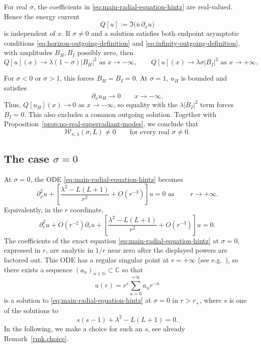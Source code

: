 \documentclass[11pt]{article}
\numberwithin{equation}{section}
\begin{document}
	{For real $\sigma$, the coefficients in \eqref{eq:main-radial-equation-hintz} are real-valued.} Hence the energy current
	\begin{equation}
		Q[u]:=\Im\bigl(\overline u\,\partial_xu\bigr)
		\label{eq:usual-flux}
	\end{equation}
	is independent of $x$. If $\sigma\neq0$ and a solution
	satisfies both endpoint asymptotic conditions \eqref{eq:horizon-outgoing-definition} and \eqref{eq:infinity-outgoing-definition}, with amplitudes $B_H,B_I$
	possibly zero, then
	\begin{equation}
		Q[u](x)\to\lambda(1-\sigma)|B_H|^2
		\text{ as } x\to -\infty,
		\qquad
		Q[u](x)\mathrel{{\to}}\lambda\sigma|B_I|^2
		\text{ as } x\to +\infty.
		\label{eq:real-frequency-fluxes}
	\end{equation}
	
	
	For $\sigma<0$ or $\sigma>1$, this
	forces $B_H=B_I=0$. At $\sigma=1$, $u_H$ is
	bounded and satisfies
	\[
	\partial_xu_H\longrightarrow0\qquad x\to-\infty.
	\]
	Thus, $Q[u_H](x)\to 0$ as $x\to -\infty$, so equality with the
	$\lambda|B_I|^2$ term forces $B_I=0$. This also excludes
	a common outgoing solution. Together with
	Proposition~\ref{prop:no-real-superradiant-modes}, we conclude that
	\begin{equation}
		\mathcal W_{\kappa,\lambda}(\sigma,L)\neq0
		\qquad\text{for every real }\sigma\neq0.
		\label{eq:no-real-zeroes-except-threshold}
	\end{equation}
	
	\subsection{The case \texorpdfstring{$\sigma=0$}{sigma = 0}}
	
	At $\sigma=0$, the ODE \eqref{eq:main-radial-equation-hintz} becomes
	\begin{equation}
		\partial_x^2u+
		\left[\frac{\lambda^2-L(L+1)}{r^2}+O(r^{-3})\right]u=0 \text{ as }
		\qquad r\to+\infty.
		\label{eq:sigma-zero-asymptotic-equation}
	\end{equation}
	Equivalently, in the $r$ coordinate,
	\begin{equation}
		\partial_r^2u+O(r^{-2})\partial_ru
		+\left[\frac{\lambda^2-L(L+1)}{r^2}+O(r^{-3})\right]u=0.
		\label{eq:sigma-zero-r-equation}
	\end{equation}
	{The coefficients of the exact equation \eqref{eq:main-radial-equation-hintz} at $\sigma=0$, expressed in $r$, are analytic in $1/r$ near zero after the displayed powers are factored out.} 
	This ODE has a regular singular point at $r=+\infty$ (see e.g.\ \cite{Olver}), so there exists a sequence $(a_n)_{n \in \mathbb{N}} \subset {\mathbb{C}}$ so that
	\[
	u(r) = r^s \sum_{n=0}^{+\infty}a_n r^{-n}
	\]
	is a solution to {\eqref{eq:main-radial-equation-hintz} at $\sigma=0$} in $r > r_+$, where $s$ is one of the solutions to 
	\begin{equation}
		s(s-1)+\lambda^2-L(L+1)=0.
		\label{eq:threshold-indicial-equation}
	\end{equation}
	In the following, we make a choice for such an $s$, see already {Remark~\ref{rmk.choice}}.
	
\end{document}
